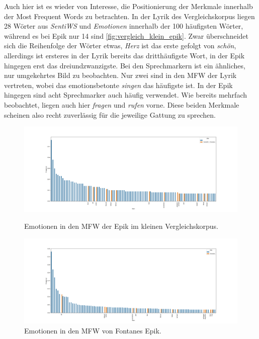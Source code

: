 \documentclass[a4paper,10p]{article}
\begin{document}
Auch hier ist es wieder von Interesse, die Positionierung der Merkmale innerhalb der Most Frequent Words zu betrachten. In der Lyrik des Vergleichskorpus liegen 28 Wörter aus \textit{SentiWS} und \textit{Emotionen} innerhalb der 100 häufigsten Wörter, während es bei Epik nur 14 sind \ref{fig:vergleich_klein_epik}. Zwar überschneidet sich die Reihenfolge der Wörter etwas, \textit{Herz} ist das erste gefolgt von \textit{schön}, allerdings ist ersteres in der Lyrik bereits das dritthäufigste Wort, in der Epik hingegen erst das dreiundzwanzigste. Bei den Sprechmarkern ist ein ähnliches, nur umgekehrtes Bild zu beobachten. Nur zwei sind in den MFW der Lyrik vertreten, wobei das emotionsbetonte \textit{singen} das häufigste ist. In der Epik hingegen sind acht Sprechmarker auch häufig verwendet. Wie bereits mehrfach beobachtet, liegen auch hier \textit{fragen} und \textit{rufen} vorne. Diese beiden Merkmale scheinen also recht zuverlässig für die jeweilige Gattung zu sprechen. \par 

\begin{figure}{}
	\centering
	\begin{minipage}[b]{.45\linewidth}
		\centering
		\includegraphics[width=\linewidth]{vergleich_epik_sentiemo_mfw.png}
		\caption{Emotionen in den MFW der Epik im kleinen Vergleichskorpus.}
		\label{vergleich_klein_epik}
	\end{minipage}
	\hfill
	\begin{minipage}[b]{.45\linewidth}
		\centering
		\includegraphics[width=\linewidth]{fontane_epik_sentiws+emotion_mfw.png}
		\caption{Emotionen in den MFW von Fontanes Epik.} 
		\label{fonane_epik}
	\end{minipage}
\end{figure}
\end{document}
